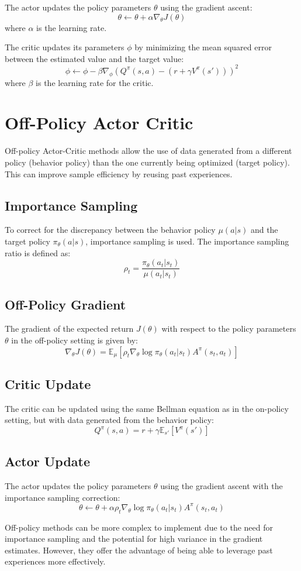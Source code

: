 \documentclass[12pt]{article}
\begin{document}
The actor updates the policy parameters $\theta$ using the gradient ascent:
\[
\theta \leftarrow \theta + \alpha \nabla_\theta J(\theta)
\]
where $\alpha$ is the learning rate.

The critic updates its parameters $\phi$ by minimizing the mean squared error between the estimated value and the target value:
\[
\phi \leftarrow \phi - \beta \nabla_\phi \left( Q^\pi(s, a) - \left( r + \gamma V^\pi(s') \right) \right)^2
\]
where $\beta$ is the learning rate for the critic.

\section{Off-Policy Actor Critic}

Off-policy Actor-Critic methods allow the use of data generated from a different policy (behavior policy) than the one currently being optimized (target policy). This can improve sample efficiency by reusing past experiences.

\subsection{Importance Sampling}
To correct for the discrepancy between the behavior policy $\mu(a|s)$ and the target policy $\pi_\theta(a|s)$, importance sampling is used. The importance sampling ratio is defined as:
\[
\rho_t = \frac{\pi_\theta(a_t|s_t)}{\mu(a_t|s_t)}
\]

\subsection{Off-Policy Gradient}
The gradient of the expected return $J(\theta)$ with respect to the policy parameters $\theta$ in the off-policy setting is given by:
\[
\nabla_\theta J(\theta) = \mathbb{E}_{\mu} \left[ \rho_t \nabla_\theta \log \pi_\theta(a_t|s_t) A^\pi(s_t, a_t) \right]
\]

\subsection{Critic Update}
The critic can be updated using the same Bellman equation as in the on-policy setting, but with data generated from the behavior policy:
\[
Q^\pi(s, a) = r + \gamma \mathbb{E}_{s'} \left[ V^\pi(s') \right]
\]

\subsection{Actor Update}
The actor updates the policy parameters $\theta$ using the gradient ascent with the importance sampling correction:
\[
\theta \leftarrow \theta + \alpha \rho_t \nabla_\theta \log \pi_\theta(a_t|s_t) A^\pi(s_t, a_t)
\]

Off-policy methods can be more complex to implement due to the need for importance sampling and the potential for high variance in the gradient estimates. However, they offer the advantage of being able to leverage past experiences more effectively.
\end{document}

